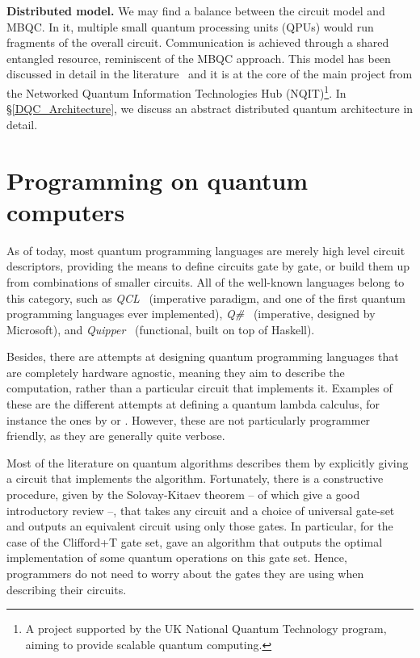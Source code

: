 \textbf{Distributed model.} We may find a balance between the circuit model and MBQC. In it, multiple small quantum processing units (QPUs) would run fragments of the overall circuit. Communication is achieved through a shared entangled resource, reminiscent of the MBQC approach. This model has been discussed in detail in the literature~\citep{DistributedQCHW} and it is at the core of the main project from the Networked Quantum Information Technologies Hub (NQIT)\footnote{A project supported by the UK National Quantum Technology program, aiming to provide scalable quantum computing.}. In \S\ref{DQC_Architecture}, we discuss an abstract distributed quantum architecture in detail.



\section{Programming on quantum computers}

As of today, most quantum programming languages are merely high level circuit descriptors, providing the means to define circuits gate by gate, or build them up from combinations of smaller circuits. All of the well-known languages belong to this category, such as \textit{QCL}~\citep{QCL} (imperative paradigm, and one of the first quantum programming languages ever implemented), \textit{Q\#}~\citep{QLang} (imperative, designed by Microsoft), and \textit{Quipper}~\citep{Quipper} (functional, built on top of Haskell). 

Besides, there are attempts at designing quantum programming languages that are completely hardware agnostic, meaning they aim to describe the computation, rather than a particular circuit that implements it. Examples of these are the different attempts at defining a quantum lambda calculus, for instance the ones by \citet{VanTonder} or \citet{Diaz-Caro}. However, these are not particularly programmer friendly, as they are generally quite verbose.

Most of the literature on quantum algorithms describes them by explicitly giving a circuit that implements the algorithm. Fortunately, there is a constructive procedure, given by the Solovay-Kitaev theorem -- of which \citet{SolovayKitaev} give a good introductory review --, that takes any circuit and a choice of universal gate-set and outputs an equivalent circuit using only those gates. In particular, for the case of the Clifford+T gate set, \citet{OptimalCliffordT} gave an algorithm that outputs the optimal implementation of some quantum operations on this gate set. Hence, programmers do not need to worry about the gates they are using when describing their circuits.

